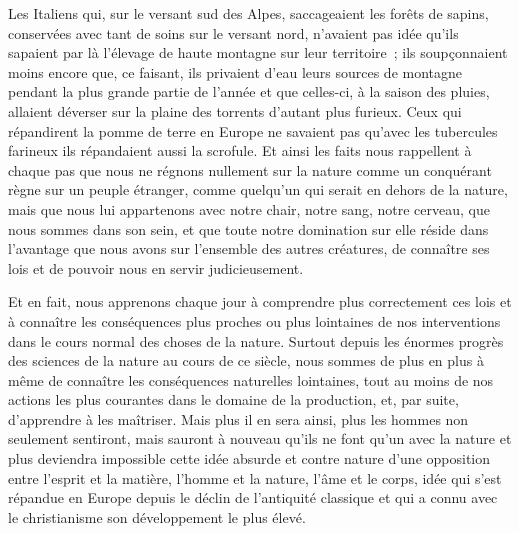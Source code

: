 \documentclass[french,twoside]{book} %
\begin{document}
Les Italiens qui, sur le versant sud des Alpes, saccageaient les forêts de sapins, conservées avec tant de soins sur le versant nord, n’avaient pas idée qu’ils sapaient par là l’élevage de haute montagne sur leur territoire ; ils soupçonnaient moins encore que, ce faisant, ils privaient d’eau leurs sources de montagne pendant la plus grande partie de l’année et que celles-ci, à la saison des pluies, allaient déverser sur la plaine des torrents d’autant plus furieux. Ceux qui répandirent la pomme de terre en Europe ne savaient pas qu’avec les tubercules farineux ils répandaient aussi la scrofule. Et ainsi les faits nous rappellent à chaque pas que nous ne régnons nullement sur la nature comme un conquérant règne sur un peuple étranger, comme quelqu’un qui serait en dehors de la nature, mais que nous lui appartenons avec notre chair, notre sang, notre cerveau, que nous sommes dans son sein, et que toute notre domination sur elle réside dans l’avantage que nous avons sur l’ensemble des autres créatures, de connaître ses lois et de pouvoir nous en servir judicieusement.\par
Et en fait, nous apprenons chaque jour à comprendre plus correctement ces lois et à connaître les conséquences plus proches ou plus lointaines de nos interventions dans le cours normal des choses de la nature. Surtout depuis les énormes progrès des sciences de la nature au cours de ce siècle, nous sommes de plus en plus à même de connaître les conséquences naturelles lointaines, tout au moins de nos actions les plus courantes dans le domaine de la production, et, par suite, d’apprendre à les maîtriser. Mais plus il en sera ainsi, plus les hommes non seulement sentiront, mais sauront à nouveau qu’ils ne font qu’un avec la nature et plus deviendra impossible cette idée absurde et contre nature d’une opposition entre l’esprit et la matière, l’homme et la nature, l’âme et le corps, idée qui s’est répandue en Europe depuis le déclin de l’antiquité classique et qui a connu avec le christianisme son développement le plus élevé.\par
\end{document}
